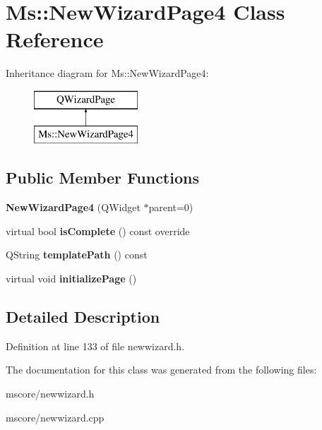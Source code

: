 \hypertarget{class_ms_1_1_new_wizard_page4}{}\section{Ms\+:\+:New\+Wizard\+Page4 Class Reference}
\label{class_ms_1_1_new_wizard_page4}
Inheritance diagram for Ms\+:\+:New\+Wizard\+Page4\+:\begin{figure}[H]
\begin{center}
\leavevmode
\includegraphics[height=2.000000cm]{class_ms_1_1_new_wizard_page4}
\end{center}
\end{figure}
\subsection*{Public Member Functions}
\begin{DoxyCompactItemize}
\item 
\mbox{\label{class_ms_1_1_new_wizard_page4_a3948e23a7c08efa2f9ac087d15e9dca2}} 
{\bfseries New\+Wizard\+Page4} (Q\+Widget $\ast$parent=0)
\item 
\mbox{\label{class_ms_1_1_new_wizard_page4_af481d9244e15dcf41d26356ebd62ce27}} 
virtual bool {\bfseries is\+Complete} () const override
\item 
\mbox{\label{class_ms_1_1_new_wizard_page4_add7cbd4ca83bc730f35f403fd166a85d}} 
Q\+String {\bfseries template\+Path} () const
\item 
\mbox{\label{class_ms_1_1_new_wizard_page4_a9f6e2780ad160e9636954572e42f555a}} 
virtual void {\bfseries initialize\+Page} ()
\end{DoxyCompactItemize}


\subsection{Detailed Description}


Definition at line 133 of file newwizard.\+h.



The documentation for this class was generated from the following files\+:\begin{DoxyCompactItemize}
\item 
mscore/newwizard.\+h\item 
mscore/newwizard.\+cpp\end{DoxyCompactItemize}
